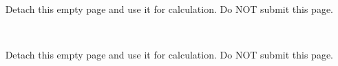 \documentclass[11pt]{article}
\numberwithin{equation}{section}
\begin{document}
\newpage
~~

\newpage
~~
Detach this empty page and use it for calculation.
Do NOT submit this page.

\newpage
~~

\newpage
~~
Detach this empty page and use it for calculation.
Do NOT submit this page.




%

%
%
%
\end{document}
